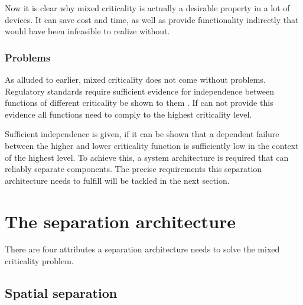 Now it is clear why mixed criticality is actually a desirable property in a lot of devices. It can save cost and time, as well as provide functionality indirectly that would have been infeasible to realize without.
\subsubsection{Problems}
As alluded to earlier, mixed criticality does not come without problems. Regulatory standards require sufficient evidence for independence between functions of different criticality be shown to them \cite{IEC.2010-1}\cite{IEC.2010-2}. If \mfg{} can not provide this evidence all functions need to comply to the highest criticality level. 

Sufficient independence is given, if it can be shown that a dependent failure between the higher and lower criticality function is sufficiently low in the context of the highest level.
To achieve this, a system architecture is required that can reliably separate components. The precise requirements this separation architecture needs to fulfill will be tackled in the next section.


\section{The separation architecture} \label{separation-arch}
There are four attributes a separation architecture needs to solve the mixed criticality problem. %
\subsection{Spatial separation}


